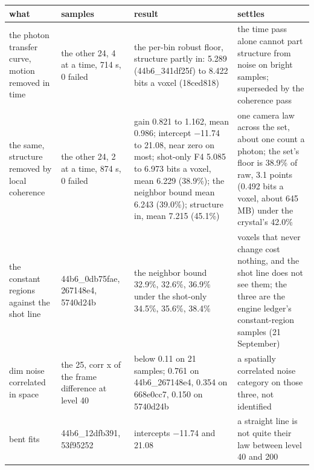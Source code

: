 {\footnotesize
\setlength{\tabcolsep}{6pt}
\begin{longtable}{>{\RaggedRight\arraybackslash}p{}>{\RaggedRight\arraybackslash}p{}>{\RaggedRight\arraybackslash}p{}>{\RaggedRight\arraybackslash}p{}}
\toprule
what & samples & result & settles \\
\midrule
\endhead
the photon transfer curve, motion removed in time & the other 24, 4 at a time, 714 s, 0 failed & the per-bin robust floor, structure partly in: 5.289 (44b6\_\allowbreak{}341df25f) to 8.422 bits a voxel (18ced818) & the time pass alone cannot part structure from noise on bright samples; superseded by the coherence pass \\
the same, structure removed by local coherence & the other 24, 2 at a time, 874 s, 0 failed & gain 0.821 to 1.162, mean 0.986; intercept −11.74 to 21.08, near zero on most; shot-only F4 5.085 to 6.973 bits a voxel, mean 6.229 (38.9\%); the neighbor bound mean 6.243 (39.0\%); structure in, mean 7.215 (45.1\%) & one camera law across the set, about one count a photon; the set's floor is 38.9\% of raw, 3.1 points (0.492 bits a voxel, about 645 MB) under the crystal's 42.0\% \\
the constant regions against the shot line & 44b6\_\allowbreak{}0db75fae, 267148e4, 5740d24b & the neighbor bound 32.9\%, 32.6\%, 36.9\% under the shot-only 34.5\%, 35.6\%, 38.4\% & voxels that never change cost nothing, and the shot line does not see them; the three are the engine ledger's constant-region samples (21 September) \\
dim noise correlated in space & the 25, corr x of the frame difference at level 40 & below 0.11 on 21 samples; 0.761 on 44b6\_\allowbreak{}267148e4, 0.354 on 668e0cc7, 0.150 on 5740d24b & a spatially correlated noise category on those three, not identified \\
bent fits & 44b6\_\allowbreak{}12dfb391, 53f95252 & intercepts −11.74 and 21.08 & a straight line is not quite their law between level 40 and 200 \\
\bottomrule
\end{longtable}
}
